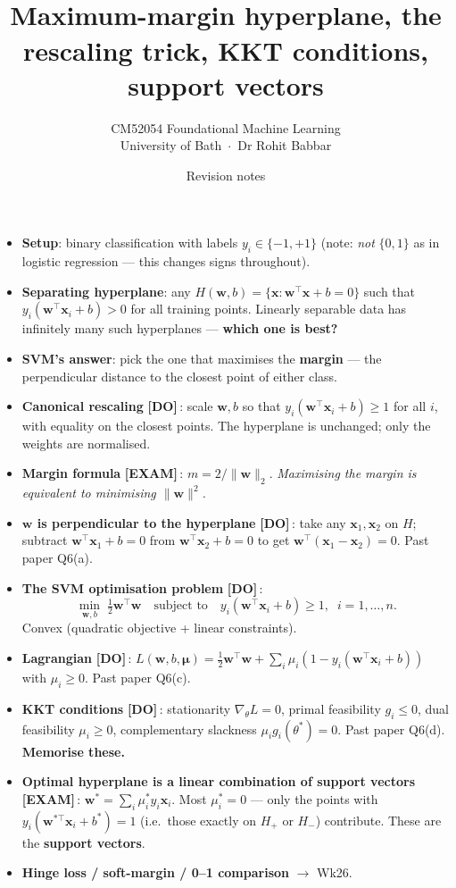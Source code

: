 \documentclass[11pt, a4paper]{article}
\title{\vspace{-1cm}{\Huge\bfseries Week 25 — Linear Support Vector Machines} \\[0.4em]{\large Maximum-margin hyperplane, the rescaling trick, KKT conditions, support vectors}}
\author{\large CM52054 Foundational Machine Learning \\[0.2em]\normalsize University of Bath \,$\cdot$\, Dr Rohit Babbar}
\date{Revision notes}
\newcommand{\examflag}{\textcolor{tipBd}{\textbf{[EXAM]}}\,}
\newcommand{\doflag}{\textcolor{defBd}{\textbf{[DO]}}\,}
\begin{document}
\maketitle\thispagestyle{empty}\vspace{1em}

\begin{tldrbox}
\begin{itemize}[leftmargin=*]
  \item \textbf{Setup}: binary classification with labels $y_i \in \{-1, +1\}$ (note: \emph{not} $\{0, 1\}$ as in logistic regression — this changes signs throughout).
  \item \textbf{Separating hyperplane}: any $H(\mathbf{w}, b) = \{\mathbf{x} : \mathbf{w}^\top\mathbf{x} + b = 0\}$ such that $y_i(\mathbf{w}^\top\mathbf{x}_i + b) > 0$ for all training points. Linearly separable data has infinitely many such hyperplanes — \textbf{which one is best?}
  \item \textbf{SVM's answer}: pick the one that maximises the \textbf{margin} — the perpendicular distance to the closest point of either class.
  \item \textbf{Canonical rescaling} \doflag{}: scale $\mathbf{w}, b$ so that $y_i(\mathbf{w}^\top\mathbf{x}_i + b) \ge 1$ for all $i$, with equality on the closest points. The hyperplane is unchanged; only the weights are normalised.
  \item \textbf{Margin formula} \examflag{}: $m = 2/\|\mathbf{w}\|_2$. \emph{Maximising the margin is equivalent to minimising $\|\mathbf{w}\|^2$.}
  \item \textbf{$\mathbf{w}$ is perpendicular to the hyperplane} \doflag{}: take any $\mathbf{x}_1, \mathbf{x}_2$ on $H$; subtract $\mathbf{w}^\top\mathbf{x}_1 + b = 0$ from $\mathbf{w}^\top\mathbf{x}_2 + b = 0$ to get $\mathbf{w}^\top(\mathbf{x}_1 - \mathbf{x}_2) = 0$. Past paper Q6(a).
  \item \textbf{The SVM optimisation problem} \doflag{}:
  \[
  \min_{\mathbf{w}, b}\;\tfrac{1}{2}\mathbf{w}^\top\mathbf{w} \quad\text{subject to}\quad y_i(\mathbf{w}^\top\mathbf{x}_i + b) \ge 1, \;\; i = 1, \ldots, n.
  \]
  Convex (quadratic objective + linear constraints).
  \item \textbf{Lagrangian} \doflag{}: $L(\mathbf{w}, b, \boldsymbol\mu) = \tfrac{1}{2}\mathbf{w}^\top\mathbf{w} + \sum_i \mu_i(1 - y_i(\mathbf{w}^\top\mathbf{x}_i + b))$ with $\mu_i \ge 0$. Past paper Q6(c).
  \item \textbf{KKT conditions} \doflag{}: stationarity $\nabla_\theta L = 0$, primal feasibility $g_i \le 0$, dual feasibility $\mu_i \ge 0$, complementary slackness $\mu_i g_i(\theta^*) = 0$. Past paper Q6(d). \textbf{Memorise these.}
  \item \textbf{Optimal hyperplane is a linear combination of support vectors} \examflag{}: $\mathbf{w}^* = \sum_i \mu_i^* y_i \mathbf{x}_i$. Most $\mu_i^* = 0$ — only the points with $y_i(\mathbf{w}^{*\top}\mathbf{x}_i + b^*) = 1$ (i.e.\ those exactly on $H_+$ or $H_-$) contribute. These are the \textbf{support vectors}.
  \item \textbf{Hinge loss / soft-margin / 0--1 comparison} $\to$ Wk26.
\end{itemize}
\end{tldrbox}
\end{document}
